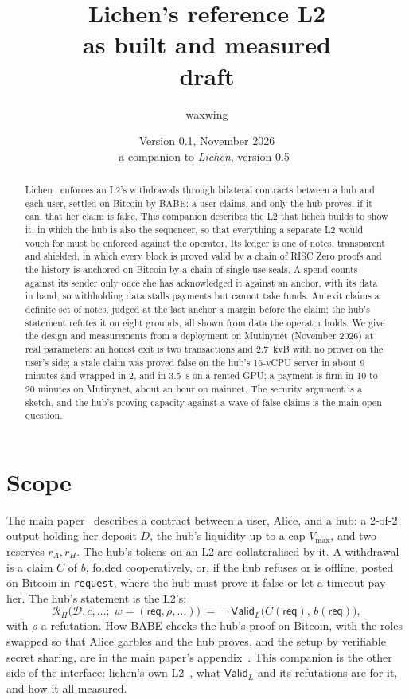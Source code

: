 \documentclass[11pt]{article}
\title{\textbf{Lichen's reference L2}\\as built and measured\\[2pt]\large draft}
\author{waxwing}
\date{Version 0.1, November 2026\\[2pt]\small a companion to \emph{Lichen}, version 0.5~\cite{lichen}}
\newcommand{\vmax}{V_{\max}}
\newcommand{\tx}[1]{\texttt{#1}}
\begin{document}
\maketitle

\begin{abstract}
Lichen~\cite{lichen} enforces an L2's withdrawals through bilateral
contracts between a hub and each user, settled on Bitcoin by BABE: a
user claims, and only the hub proves, if it can, that her claim is
false. This companion describes the L2 that lichen builds to show it,
in which the hub is also the sequencer, so that everything a separate
L2 would vouch for must be enforced against the operator. Its ledger is
one of notes, transparent and shielded, in which every block is proved
valid by a chain of RISC Zero proofs and the history is anchored on
Bitcoin by a chain of single-use seals. A spend counts against its
sender only once she has acknowledged it against an anchor, with its
data in hand, so withholding data stalls payments but cannot take
funds. An exit claims a definite set of notes, judged at the last anchor
a margin before the claim; the hub's statement refutes it on eight
grounds, all shown from data the operator holds. We give the design and
measurements from a deployment on Mutinynet (November 2026) at real
parameters: an honest exit is two transactions and 2.7~kvB with no
prover on the user's side; a stale claim was proved false on the hub's
16-vCPU server in about 9 minutes and wrapped in 2, and in 3.5~s on a
rented GPU; a payment is firm in 10 to 20 minutes on Mutinynet, about an
hour on mainnet. The security argument is a sketch, and the hub's
proving capacity against a wave of false claims is the main open
question.
\end{abstract}

\tableofcontents

\section{Scope}
\label{sec:scope}

The main paper~\cite{lichen} describes a contract between a user,
Alice, and a hub: a 2-of-2 output holding her deposit $D$, the hub's
liquidity up to a cap $\vmax$, and two reserves $r_A, r_H$. The hub's
tokens on an L2 are collateralised by it. A withdrawal is a claim $C$
of $b$, folded cooperatively, or, if the hub refuses or is offline,
posted on Bitcoin in \tx{request}, where the hub must prove it false or
let a timeout pay her. The hub's statement is the L2's:
\[
  \mathcal{R}_H\big(\mathcal{D}, c, \ldots;\; w = (\mathsf{req}, \rho,
  \ldots)\big) \;=\; \neg\,\mathsf{Valid}_L\big(C(\mathsf{req}),\,
  b(\mathsf{req})\big),
\]
with $\rho$ a refutation. How BABE checks the hub's proof on Bitcoin,
with the roles swapped so that Alice garbles and the hub proves, and the
setup by verifiable secret sharing, are in the main paper's
appendix~\cite[App.~A]{lichen}. This companion is the other side of the
interface: lichen's own L2~\cite{lichencode}, what $\mathsf{Valid}_L$
and its refutations are for it, and how it all measured.
\end{document}
